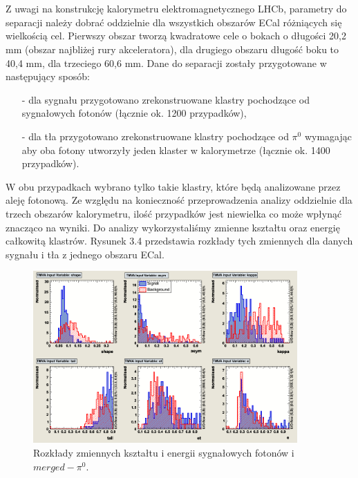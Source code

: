 \documentclass{pracamgr}
\begin{document}
\\\\
\noindent
Z uwagi na konstrukcję kalorymetru elektromagnetycznego LHCb, parametry do separacji należy dobrać oddzielnie dla wszystkich obszarów ECal różniących się wielkością cel. Pierwszy obszar tworzą kwadratowe cele o bokach o długości 20,2 mm (obszar najbliżej rury akceleratora), dla drugiego obszaru długość boku to 40,4 mm, dla trzeciego 60,6 mm. Dane do separacji zostały przygotowane w następujący sposób:
\begin{itemize}
 \item[-] dla sygnału przygotowano zrekonstruowane klastry pochodzące od sygnałowych fotonów (łącznie ok. 1200 przypadków),
 \item[-] dla tła przygotowano zrekonstruowane klastry pochodzące od $\pi^0$ wymagając aby oba fotony utworzyły jeden klaster w kalorymetrze (łącznie ok. 1400 przypadków). 
\end{itemize}
\noindent
W obu przypadkach wybrano tylko takie klastry, które będą analizowane przez aleję fotonową. Ze względu na konieczność przeprowadzenia analizy oddzielnie dla trzech obszarów kalorymetru, ilość przypadków jest niewielka co może wpłynąć znacząco na wyniki. Do analizy wykorzystaliśmy zmienne kształtu oraz energię całkowitą klastrów. Rysunek 3.4 przedstawia rozkłady tych zmiennych dla danych sygnału i tła z jednego obszaru ECal. \\
\begin{figure}[!h]
 \centering
 \includegraphics[width=0.9\textwidth]{rysunki/tmva/vars.png}
 \caption{Rozkłady zmiennych kształtu i energii sygnałowych fotonów i $merged-\pi^0$.}
\end{figure}
\end{document}
